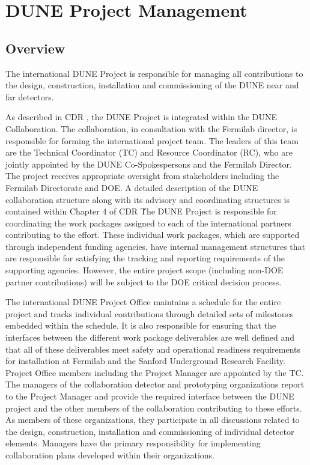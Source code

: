 \chapter{DUNE Project Management}
\label{ch:detectors-pm}

\section{Overview}


The international DUNE Project is responsible for managing all
contributions to the design, construction, installation and
commissioning of the DUNE near and far detectors.

As described in CDR \volintro, the DUNE Project is integrated within the
DUNE Collaboration.  The collaboration, in consultation with the
Fermilab director, is responsible for forming the international
project team.  The leaders of this team are the Technical Coordinator
(TC) and Resource Coordinator (RC), who are jointly appointed by the
DUNE Co-Spokespersons and the Fermilab Director.  The project receives
appropriate oversight from stakeholders including the Fermilab
Directorate and DOE.  A detailed description of the DUNE collaboration
structure along with its advisory and coordinating structures is
contained within Chapter 4  of CDR \volintro\.

The DUNE Project is responsible for coordinating the work
packages assigned to each of the international partners contributing
to the effort.  These individual work packages, which are supported
through independent funding agencies, have internal management
structures that are responsible for satisfying the tracking and
reporting requirements of the supporting agencies.  However, the
entire project scope (including non-DOE partner contributions) will be
subject to the DOE critical decision process.

The international DUNE Project Office maintains a schedule for the
entire project and tracks individual contributions through detailed
sets of milestones embedded within the schedule.  It is also responsible
for ensuring that the interfaces between the different work package
deliverables are well defined and that all of these deliverables meet
safety and operational readiness requirements for installation at
Fermilab and the Sanford Underground Research Facility.  Project
Office members including the Project Manager are appointed by the TC.
The managers of the collaboration detector and prototyping
organizations report to the Project Manager and provide the required
interface between the DUNE project and the other members of the
collaboration contributing to these efforts.  As members of these
organizations, they participate in all discussions related to the
design, construction, installation and commissioning of individual
detector elements.  Managers have the primary responsibility for
implementing collaboration plans developed within their organizations.
 
